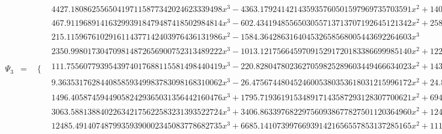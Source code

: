 \documentclass{article}
\begin{document}
\begin{landscape}
\begin{eqnarray*}
\begin{array}{cc}
\end{array}\\
\Psi_3 & = & \begin{array}{cc}
 \{ & 
\begin{array}{cc}
 4427.180862556504197115877342024623339498 x^3-4363.179241421435935760501597969735703591 x^2+1408.333781984846960205619313021107892173 x-148.3165843273321133943017652034822708302 & x\geq \frac{1}{4}\land x<\frac{3}{8} \\
 467.9119689141632993918479487418502984814 x^3-602.4341948556503055713713707192645121342 x^2+258.0915615658703037910965428744243752588 x-37.04095328035915070578655206917722870125 & x\geq \frac{3}{8}\land x<\frac{1}{2} \\
 215.1159676102916114377142403976436131986 x^2-1584.364286316404532658568005443692264603 x^3 & x\geq 0\land x<\frac{1}{8} \\
 2350.998017304709814872656900752313489222 x^3-1013.121756645970915291720183386699985140 x^2+122.5893230818258966418324384681481298742 x-3.818705442984124060103565581802221248168 & x\geq \frac{1}{8}\land x<\frac{1}{4} \\
 111.7556077939543974017688115581498440419 x^3-220.8280478023627059825289603449466634023 x^2+143.6026853527393806948134853878818673566 x-30.67850679708947630609573377152288012816 & \left(x\geq \frac{1}{2}\land x<\frac{5}{8}\right)\lor \left(x\geq \frac{5}{8}\land x<\frac{3}{4}\right) \\
 9.363531762844085859349983783098168310062 x^3-26.47567448045246005380353618031215996172 x^2+24.86075367237266252955712101132981499326 x-7.748610954764288335103568614115823341598 & \left(x\geq \frac{3}{4}\land x<\frac{7}{8}\right)\lor \left(x\geq \frac{7}{8}\land x<1\right) \\
 1496.405874594490582429365031356442160476 x^3+1795.719361915348917143587293128307700621 x^2+694.3618777442739563170340989972884503069 x+85.89357752711209270789079365891100321214 & x\geq -\frac{1}{2}\land x<-\frac{3}{8} \\
 3063.588138840226342175622583231393522724 x^3+3406.863397682297560938677827501120364960 x^2+1241.564886840815665520399595079652842613 x+147.1719531246718023308372988807765076477 & x\geq -\frac{3}{8}\land x<-\frac{1}{4} \\
 12485.49140748799359390002345083778682735 x^3+6685.141073997669391421656557853137285165 x^2+1114.096862127045221063563797579462558099 x+57.62983074913981511963594241507777439108 & x\geq -\frac{1}{4}\land x<-\frac{1}{8} \\

\end{array}
\end{array}
\end{eqnarray*}
\end{landscape}
\end{document}
